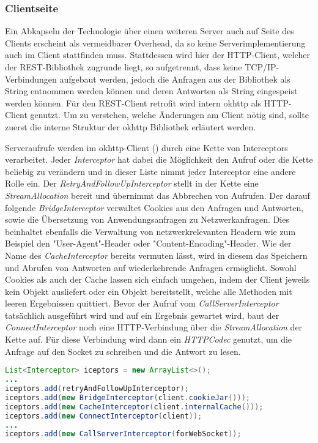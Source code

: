         \subsubsection{Clientseite}
        Ein Abkapseln der Technologie über einen weiteren Server auch auf Seite des Clients erscheint als vermeidbarer Overhead, da so keine Serverimplementierung auch im Client stattfinden muss. Stattdessen wird hier der HTTP-Client, welcher der REST-Bibliothek zugrunde liegt, so aufgetrennt, dass keine TCP/IP-Verbindungen aufgebaut werden, jedoch die Anfragen aus der Bibliothek als String entnommen werden können und  deren Antworten als String eingespeist werden können. Für den REST-Client retrofit wird intern okhttp als HTTP-Client genutzt. Um zu verstehen, welche Änderungen am Client nötig sind, sollte zuerst die interne Struktur der okhttp Bibliothek erläutert werden.
        
        Serveraufrufe werden im okhttp-Client () durch eine Kette von Interceptors verarbeitet. Jeder {\it Interceptor} hat dabei die Möglichkeit den Aufruf oder die Kette beliebig zu verändern und in dieser Liste nimmt jeder Interceptor eine andere Rolle ein. Der {\it RetryAndFollowUpInterceptor} stellt in der Kette eine {\it StreamAllocation} bereit und übernimmt das Abbrechen von Aufrufen. Der darauf folgende {\it BridgeInterceptor} verwaltet Cookies aus den Anfragen und Antworten, sowie die Übersetzung von Anwendungsanfragen zu Netzwerkanfragen. Dies beinhaltet ebenfalls die Verwaltung von netzwerkrelevanten Headern wie zum Beispiel den "User-Agent"-Header oder "Content-Encoding"-Header. Wie der Name des {\it CacheInterceptor} bereits vermuten lässt, wird in diesem das Speichern und Abrufen von Antworten auf wiederkehrende Anfragen ermöglicht. Sowohl Cookies als auch der Cache lassen sich einfach umgehen, indem der Client jeweils kein Objekt ausliefert oder ein Objekt bereitstellt, welche alle Methoden mit leeren Ergebnissen quittiert. Bevor der Aufruf vom {\it CallServerInterceptor} tatsächlich ausgeführt wird und auf ein Ergebnis gewartet wird, baut der {\it ConnectInterceptor} noch eine HTTP-Verbindung über die {\it StreamAllocation} der Kette auf. Für diese Verbindung wird dann ein {\it HTTPCodec} genutzt, um die Anfrage auf den Socket zu schreiben und die Antwort zu lesen.
        
        \begin{lstlisting}[frame=bt, label={lst:android:okhttp}, language=Java, caption=Interner Aufbau von okhttp (Clientcode in Java) \cite{okhttpRealCall}]
List<Interceptor> iceptors = new ArrayList<>();
...
iceptors.add(retryAndFollowUpInterceptor);
iceptors.add(new BridgeInterceptor(client.cookieJar()));
iceptors.add(new CacheInterceptor(client.internalCache()));
iceptors.add(new ConnectInterceptor(client));
...
iceptors.add(new CallServerInterceptor(forWebSocket));
        \end{lstlisting}        
        
